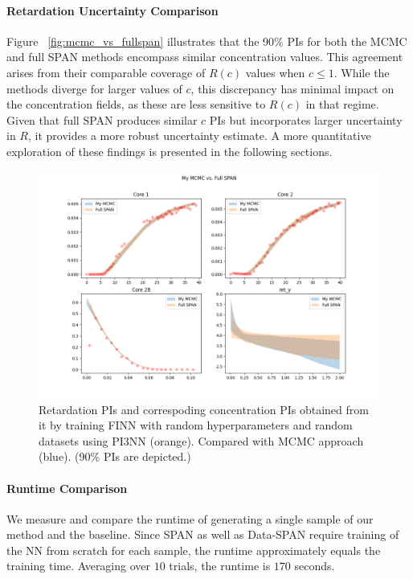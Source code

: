 \paragraph{Retardation Uncertainty Comparison}
Figure ~\vref{fig:mcmc_vs_fullspan} illustrates that the 90\% PIs for both the MCMC and full SPAN methods encompass similar concentration values. This agreement arises from their comparable coverage of $R(c)$ values when $c \leq 1$. While the methods diverge for larger values of $c$, this discrepancy has minimal impact on the concentration fields, as these are less sensitive to $R(c)$ in that regime. Given that full SPAN produces similar $c$ PIs but incorporates larger uncertainty in $R$, it provides a more robust uncertainty estimate. A more quantitative exploration of these findings is presented in the following sections.

\begin{figure}[h]
    \centering
    \includegraphics{figs/finn_My MCMCvsFull SPAN_PIs.png}
    \caption{Retardation PIs and correspoding concentration PIs obtained from it by training FINN with random hyperparameters and random datasets using PI3NN (orange). Compared with MCMC approach (blue). (90\% PIs are depicted.)}
    \label{fig:mcmc_vs_fullspan}
\end{figure}




\paragraph{Runtime Comparison}
We measure and compare the runtime of generating a single sample of our method and the baseline. Since SPAN as well as Data-SPAN require training of the NN from scratch for each sample, the runtime approximately equals the training time. Averaging over $10$ trials, the runtime is $170$ seconds.

